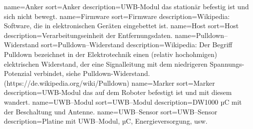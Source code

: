 %
%
%
%


%
%



{
	name={Anker}
	sort={Anker}
	description={UWB-Modul das stationär befestig ist und sich nicht bewegt.}
}
{
	name={Firmware}
	sort={Firmware}
	description={Wikipedia: Software, die in elektronischen Geräten eingebettet ist.}
}
{
	name={Host}
	sort={Host}
	description={Verarbeitungseinheit der Entfernungsdaten.}
}
{
	name={Pulldown--Widerstand}
	sort={Pulldown--Widerstand}
	description={Wikipedia: Der Begriff Pulldown bezeichnet in der Elektrotechnik einen (relativ hochohmigen) elektrischen Widerstand, der eine Signalleitung mit dem niedrigeren Spannungs-Potenzial verbindet, siehe Pulldown-Widerstand. (https://de.wikipedia.org/wiki/Pulldown)}
}
{
	name={Marker}
	sort={Marker}
	description={UWB-Modul das auf dem Roboter befestigt ist und mit diesem wandert.}
}
{
	name={UWB--Modul}
	sort={UWB--Modul}
	description={DW1000 µC mit der Beschaltung und Antenne.}
}
{
	name={UWB--Sensor}
	sort={UWB--Sensor}
	description={Platine mit UWB--Modul, µC, Energieversorgung, usw.}
}
